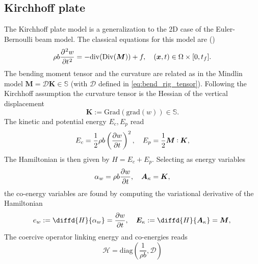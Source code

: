 \documentclass{ifacconf}
\def\onedot{$\mathsurround0pt\ldotp$}
\def\cddot{%
	\mathbin{\vcenter{\baselineskip.67ex
			\hbox{\onedot}\hbox{\onedot}}%
}}
\begin{document}
\subsection{Kirchhoff plate}
The Kirchhoff plate model is a generalization to the 2D case of the Euler-Bernoulli beam model. The classical equations for this model are (\cite{timoshenko1959theory}) 
\begin{equation}
\label{eq:clKir}
\displaystyle \rho b \diffp[2]{w}{t} = -\mathrm{div}(\mathrm{Div}(\bm{M})) + f, \quad (\bm{x}, t) \in \Omega \times [0, t_f].
\end{equation}
The bending moment tensor and the curvature are related as in the Mindlin model $\bm{M} = \mathcal{D} \bm{K} \in \mathbb{S}$ (with $\mathcal{D}$ defined in \eqref{eq:bend_rig_tensor}). Following the Kirchhoff assumption the curvature tensor is the Hessian of the vertical displacement
\begin{equation*}
\bm{K} := \mathrm{Grad}(\mathrm{grad}(w)) \in \mathbb{S}.
\end{equation*}
 The kinetic and potential energy $E_c, E_p$ read
\begin{equation}
E_c =  \frac{1}{2}\rho b \left(\diffp{w}{t} \right)^2, \quad
E_p = \frac{1}{2} \bm{M} \cddot \bm{K},
\end{equation} 
The Hamiltonian is then given by $H=E_c + E_p$. Selecting as energy variables
\begin{equation}
\alpha_w = \rho b \diffp{w}{t}, \quad \bm{A}_{\kappa} = \bm{K}, 
\end{equation}
the co-energy variables are found by computing the variational derivative of the Hamiltonian
\begin{equation}
e_w := \diffd{H}{\alpha_w} = \diffp{w}{t}, \quad \bm{E}_{\kappa} := \diffd{H}{\bm{A}_{\kappa}} = \bm{M}, \\
\end{equation}
The coercive operator linking energy and co-energies reads
\begin{equation}
\mathcal{H} = \mathrm{diag}(\frac{1}{\rho b}, \mathcal{D})
\end{equation}
 
\end{document}
